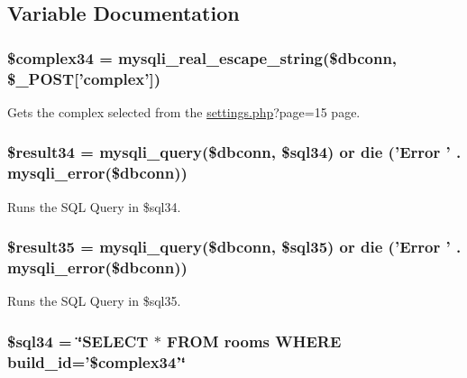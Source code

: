 \subsection{\-Variable \-Documentation}
\hypertarget{displayRooms_8php_ac3ea7ac9c4cf508721396f2df0f2943e}{
\subsubsection[{\$complex34}]{\setlength{\rightskip}{0pt plus 5cm}\$complex34 = mysqli\-\_\-real\-\_\-escape\-\_\-string(\$dbconn, \$\-\_\-\-P\-O\-S\-T\mbox{[}'complex'\mbox{]})}}\label{displayRooms_8php_ac3ea7ac9c4cf508721396f2df0f2943e}
\-Gets the complex selected from the \hyperlink{settings_8php}{settings.\-php}?page=15 page. \hypertarget{displayRooms_8php_adc77f040461aac6f192259ee524949cc}{
\subsubsection[{\$result34}]{\setlength{\rightskip}{0pt plus 5cm}\$result34 = mysqli\-\_\-query(\$dbconn, \$sql34) or die ('\-Error ' . mysqli\-\_\-error(\$dbconn))}}\label{displayRooms_8php_adc77f040461aac6f192259ee524949cc}
\-Runs the \-S\-Q\-L \-Query in \$sql34. \hypertarget{displayRooms_8php_a4bb5768155ac2f9d5bd3b6c91a11c3a9}{
\subsubsection[{\$result35}]{\setlength{\rightskip}{0pt plus 5cm}\$result35 = mysqli\-\_\-query(\$dbconn, \$sql35) or die ('\-Error ' . mysqli\-\_\-error(\$dbconn))}}\label{displayRooms_8php_a4bb5768155ac2f9d5bd3b6c91a11c3a9}
\-Runs the \-S\-Q\-L \-Query in \$sql35. \hypertarget{displayRooms_8php_aa3036dfed222dfa1b4e1082d67e72987}{
\subsubsection[{\$sql34}]{\setlength{\rightskip}{0pt plus 5cm}\$sql34 = \char`\"{}\-S\-E\-L\-E\-C\-T $\ast$ \-F\-R\-O\-M rooms \-W\-H\-E\-R\-E build\-\_\-id='\$complex34'\char`\"{}}}\label{displayRooms_8php_aa3036dfed222dfa1b4e1082d67e72987}
